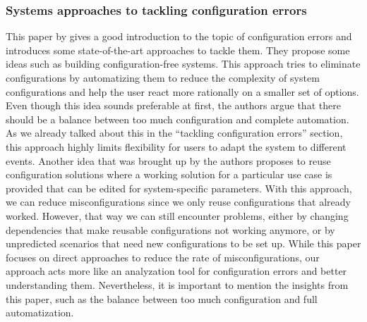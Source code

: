 \documentclass[english,bachelor]{swsLeipzig}
\begin{document}
\subsubsection{Systems approaches to tackling configuration errors}
This paper by \citet{xuzhou:2015} gives a good introduction to the topic of configuration errors and introduces some 
state-of-the-art approaches to tackle them. They propose some ideas such as building configuration-free systems. This approach tries to eliminate configurations by automatizing them to reduce the complexity of system configurations and help the user react more rationally on a smaller set of options. Even though this idea sounds preferable at first, the authors argue that there should be a balance between too much configuration and complete automation. As we already talked about this in the ``tackling configuration errors'' section, this approach highly limits flexibility for users to adapt the system to different events. Another idea that was brought up by the authors proposes to reuse configuration solutions where a working solution for a particular use case is provided that can be edited for system-specific parameters. With this approach, we can reduce misconfigurations since we only reuse configurations that already worked. However, that way we can still encounter problems, either by changing dependencies that make reusable configurations not working anymore, or by unpredicted scenarios that need new configurations to be set up.  While this paper focuses on direct approaches to reduce the rate of misconfigurations, our approach acts more like an analyzation tool for configuration errors and better understanding them. Nevertheless, it is important to mention the insights from this paper, such as the balance between too much configuration and full automatization.
\end{document}
